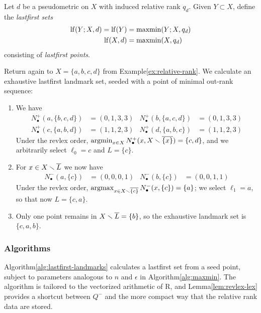 \documentclass[
]{article}
\begin{document}
\begin{definition}
    Let $d$ be a pseudometric on $X$ with induced relative rank $q_d$.
    Given $Y\subset X$, define the \emph{lastfirst sets}
    \begin{align*}
        \operatorname{lf}(Y;X,d) = \operatorname{lf}(Y) &= \operatorname{maxmin}(Y;X,q_d) \\
        \operatorname{lf}(X,d) &= \operatorname{maxmin}(X,q_d)
    \end{align*}
    consisting of \emph{lastfirst points}.
\end{definition}

\begin{example}
    Return again to $X=\{a,b,c,d\}$ from Example\nbs\ref{ex:relative-rank}. We calculate an exhaustive lastfirst landmark set, seeded with a point of minimal out-rank sequence:
    \begin{enumerate}
        \item We have
        \begin{align*}
            N_\bullet^+(a,\{b,c,d\}) &= (0,1,3,3) &
            N_\bullet^+(b,\{a,c,d\}) &= (0,1,3,3) \\
            N_\bullet^+(c,\{a,b,d\}) &= (1,1,2,3) &
            N_\bullet^+(d,\{a,b,c\}) &= (1,1,2,3)
        \end{align*}
        Under the revlex order, $\operatorname{argmin}_{x\in X}{N_\bullet^+(x,X \smallsetminus \overline{\{x\}})}=\{c,d\}$, and we arbitrarily select $\ell_0=c$ and $L=\{c\}$.
        \item For $x \in X \smallsetminus \overline{L}$ we now have
        \begin{align*}
            N_\bullet^-(a,\{c\}) &= (0,0,0,1) &
            N_\bullet^-(b,\{c\}) &= (0,0,1,1)
        \end{align*}
        Under the revlex order, $\operatorname{argmax}_{x\in X \smallsetminus \overline{\{c\}}}{N_\bullet^-(x,\{c\})}=\{a\}$; we select $\ell_1=a$, so that now $L=\{c,a\}$.
        \item Only one point remains in $X\smallsetminus \overline{L}=\{b\}$, so the exhaustive landmark set is $\{c,a,b\}$.
    \end{enumerate}
\end{example}

\hypertarget{algorithms}{%
\subsubsection{Algorithms}\label{algorithms}}

Algorithm\nbs\ref{alg:lastfirst-landmarks} calculates a lastfirst set
from a seed point, subject to parameters analogous to \(n\) and
\(\epsilon\) in Algorithm\nbs\ref{alg:maxmin}. The algorithm is tailored
to the vectorized arithmetic of R, and Lemma\nbs\ref{lem:revlex-lex}
provides a shortcut between \(Q^-\) and the more compact way that the
relative rank data are stored.
\end{document}
